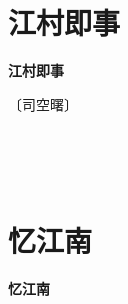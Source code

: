 \documentclass[12pt,UTF-8,openany,fontset=none]{ctexbook}
\begin{document}
\vspace{8pt}
\clearpage

\section{江村即事}



\begin{center}
    {\bfseries 江村即事}
\end{center}

\begin{center}
    \vspace{10pt}
    
    \begin{large}
        
        〔司空曙〕
        
    \end{large}
    
    \vspace{8pt}
    
    \begin{huge}
        
        \phantom{。}~~

        \phantom{。}
        
        \phantom{。}~~

        \phantom{。}
        
    \end{huge}
    
\end{center}

\vspace{8pt}
\clearpage

\section{忆江南}



\begin{center}
    {\bfseries 忆江南}
\end{center}
\end{document}
